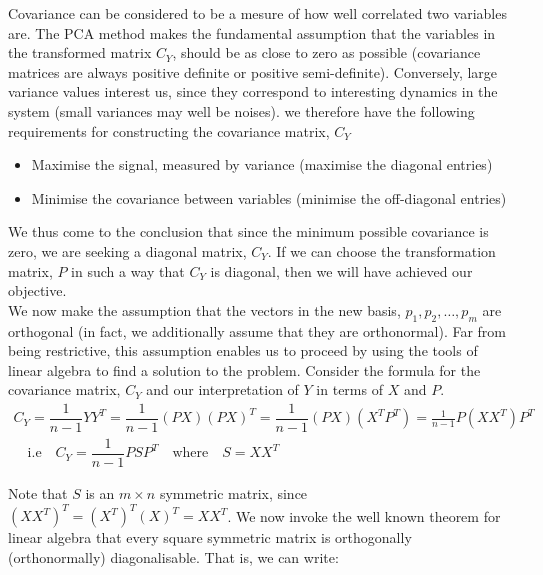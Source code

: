 \begin{appendix}
Covariance can be considered to be a mesure of how well correlated two variables are. The PCA method makes the fundamental assumption that the variables in the transformed matrix $C_{Y}$, should be as close to zero as possible (covariance matrices are always positive definite or positive semi-definite). Conversely, large variance values interest us, since they correspond to interesting dynamics in the system (small variances may well be noises). we therefore have the following requirements for constructing the covariance matrix, $C_{Y}$
\begin{itemize}
\item Maximise the signal, measured by variance (maximise the diagonal entries)
\item Minimise the covariance between variables (minimise the off-diagonal entries)\\
\end{itemize}

We thus come to the conclusion that since the minimum possible covariance is zero, we are seeking a diagonal matrix, $C_Y$. If we can choose the transformation matrix, $P$ in such a way that $C_Y$ is diagonal, then we will have achieved our objective.\\

We now make the assumption that the vectors in the new basis, $p_{1}, p_{2},\ldots , p_{m}$ are orthogonal (in fact, we additionally assume that they are orthonormal). Far from being restrictive, this assumption enables us to proceed by using the tools of linear algebra to find a solution to the problem. Consider the formula for the covariance matrix, $C_Y$ and our interpretation of $Y$ in terms of $X$ and $P$.\\
\begin{equation*}
\begin{multlined}
C_{Y} = \dfrac{1}{n-1} YY^{T} = \dfrac{1}{n-1} (PX)(PX)^T = \dfrac{1}{n-1} (PX)(X^{T}P^{T}) = \frac{1}{n-1} P(XX^{T})P^{T} \\
\quad \textrm{i.e} \quad C_{Y} = \dfrac{1}{n-1} PSP^{T} \quad \textrm{where} \quad  S = XX^{T}
\end{multlined}
\end{equation*}

Note that $S$ is an $ m \times n$ symmetric matrix, since $(XX^{T})^T = (X^T)^T(X)^{T}=XX^{T}$. We now invoke the well known theorem for linear algebra that every square symmetric matrix is orthogonally  (orthonormally) diagonalisable. That is, we can write:\\


\end{appendix}
